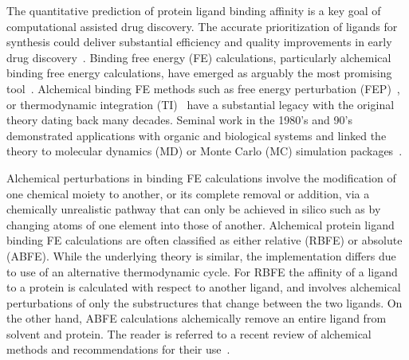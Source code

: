 \documentclass[9pt,bestpractices]{livecoms}
\begin{document}
The quantitative prediction of protein ligand binding affinity is a key goal of computational assisted drug discovery. The accurate prioritization of ligands for synthesis could deliver substantial efficiency and quality improvements in early drug discovery~\cite{abelCriticalReviewValidation2017,abelModelingValuePredictive2018}. Binding free energy (FE) calculations, particularly alchemical binding free energy calculations, have emerged as arguably the most promising tool~\cite{courniaRelativeBindingFree2017}. Alchemical binding FE methods such as free energy perturbation (FEP)~\cite{zwanzigHighTemperatureEquation1954,bennettEfficientEstimationFree1976}, or thermodynamic integration (TI)~\cite{kirkwoodQuantumStatisticsAlmost1933,kirkwoodQuantumStatisticsAlmost1934,kirkwoodStatisticalMechanicsFluid1935} have a substantial legacy with the original theory dating back many decades. Seminal work in the 1980’s and 90’s demonstrated applications with organic and biological systems and linked the theory to molecular dynamics (MD) or Monte Carlo (MC) simulation packages~\cite{jorgensenMonteCarloSimulation1985,straatsmaFreeEnergyHydrophobic1986,lybrandTheoreticalCalculationRelative1986,merzFreeEnergyPerturbation1989,pearlmanDeterminationDifferentialEffects1995,choderaAlchemicalFreeEnergy2011,mobleyPerspectiveAlchemicalFree2012}. 

Alchemical perturbations in binding FE calculations involve the modification of one chemical moiety to another, or its complete removal or addition, via a chemically unrealistic pathway that can only be achieved in silico such as by changing atoms of one element into those of another. Alchemical protein ligand binding FE calculations are often classified as either relative (RBFE) or absolute (ABFE). While the underlying theory is similar, the implementation differs due to use of an alternative thermodynamic cycle. For RBFE the affinity of a ligand to a protein is calculated with respect to another ligand, and involves alchemical perturbations of only the substructures that change between the two ligands. On the other hand, ABFE calculations alchemically remove an entire ligand from solvent and protein. The reader is referred to a recent review of alchemical methods and recommendations for their use~\cite{meyBestPracticesAlchemical2020}.
\end{document}
